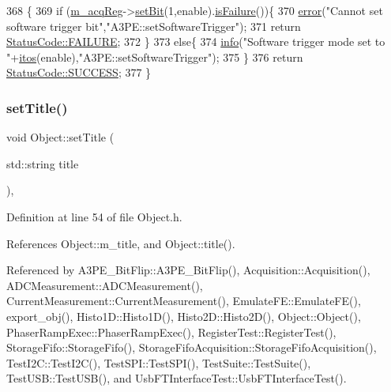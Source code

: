 \begin{DoxyCode}
368                                               \{
369   \textcolor{keywordflow}{if} (\hyperlink{classA3PE_abaf426f4c9192537117b77f9f4821e04}{m\_acqReg}->\hyperlink{classRegister_ab094246dd12aa7e0aa0ca917f4e70b31}{setBit}(1,enable).\hyperlink{classStatusCode_a5dd22dc6eb2c52fc4cabc58f6dea2eb7}{isFailure}())\{
370     \hyperlink{classObject_a204a95f57818c0f811933917a30eff45}{error}(\textcolor{stringliteral}{"Cannot set software trigger bit"},\textcolor{stringliteral}{"A3PE::setSoftwareTrigger"});
371     \textcolor{keywordflow}{return} \hyperlink{classStatusCode_a6f565cbeadc76d14c72f047e5e85eb4ba3da73d4c469762eb9d3c960368252b26}{StatusCode::FAILURE};
372   \}
373   \textcolor{keywordflow}{else}\{
374     \hyperlink{classObject_a644fd329ea4cb85f54fa6846484b84a8}{info}(\textcolor{stringliteral}{"Software trigger mode set to "}+\hyperlink{Tools_8h_af330027dbdafb9a30768b3613c553e60}{itos}(enable),\textcolor{stringliteral}{"A3PE::setSoftwareTrigger"});
375   \}
376   \textcolor{keywordflow}{return} \hyperlink{classStatusCode_a6f565cbeadc76d14c72f047e5e85eb4badd0da38d3ba0d922efd1f4619bc37ad8}{StatusCode::SUCCESS};
377 \}
\end{DoxyCode}
\mbox{\label{classObject_a89557dbbad5bcaa02652f5d7fa35d20f}} 
\subsubsection{\texorpdfstring{set\+Title()}{setTitle()}}
{\footnotesize\ttfamily void Object\+::set\+Title (\begin{DoxyParamCaption}\item[{std\+::string}]{title }\end{DoxyParamCaption})\hspace{0.3cm}{\ttfamily [inline]}, {\ttfamily [inherited]}}



Definition at line 54 of file Object.\+h.



References Object\+::m\+\_\+title, and Object\+::title().



Referenced by A3\+P\+E\+\_\+\+Bit\+Flip\+::\+A3\+P\+E\+\_\+\+Bit\+Flip(), Acquisition\+::\+Acquisition(), A\+D\+C\+Measurement\+::\+A\+D\+C\+Measurement(), Current\+Measurement\+::\+Current\+Measurement(), Emulate\+F\+E\+::\+Emulate\+F\+E(), export\+\_\+obj(), Histo1\+D\+::\+Histo1\+D(), Histo2\+D\+::\+Histo2\+D(), Object\+::\+Object(), Phaser\+Ramp\+Exec\+::\+Phaser\+Ramp\+Exec(), Register\+Test\+::\+Register\+Test(), Storage\+Fifo\+::\+Storage\+Fifo(), Storage\+Fifo\+Acquisition\+::\+Storage\+Fifo\+Acquisition(), Test\+I2\+C\+::\+Test\+I2\+C(), Test\+S\+P\+I\+::\+Test\+S\+P\+I(), Test\+Suite\+::\+Test\+Suite(), Test\+U\+S\+B\+::\+Test\+U\+S\+B(), and Usb\+F\+T\+Interface\+Test\+::\+Usb\+F\+T\+Interface\+Test().


